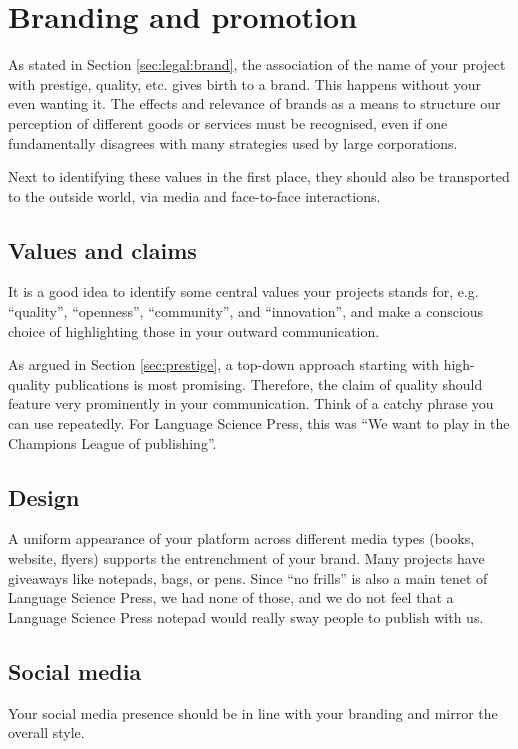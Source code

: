 \documentclass[nonflat,modfonts,output=book] {langsci/langscibook}
\begin{document}
\section{Branding and promotion}\label{sec:branding}
As stated in Section \ref{sec:legal:brand}, the association of the name of your project with prestige, quality, etc. gives birth to a brand. This happens without your even wanting it. The effects and relevance of brands as a means to structure our perception of different goods or services must be  recognised, even if one  fundamentally disagrees with many strategies used by large corporations. 

Next to identifying these values in the first place, they should also be transported to the outside world, via media and face-to-face interactions. 

\subsection{Values and claims}
It is a good idea to identify some central values your projects stands for, e.g. ``quality'', ``openness'', ``community'', and ``innovation'', and make a conscious choice of highlighting those in your outward communication. 

As argued in Section \ref{sec:prestige}, a top-down approach starting with high-quality publications is most promising. Therefore, the claim of quality should feature very prominently in your communication. Think of a catchy phrase you can use repeatedly. For Language Science Press, this was ``We want to play in the Champions League of publishing''. 

\subsection{Design}
A uniform appearance of your platform across different media types (books, website, flyers) supports the entrenchment of your brand. Many projects have giveaways like notepads, bags, or pens. Since  ``no frills'' is also a main tenet of Language Science Press, we had none of those, and we do not feel that a Language Science Press notepad would really sway people to publish with us. 

\subsection{Social media}
Your social media presence should be in line with your branding and mirror the overall style. 
\end{document}
